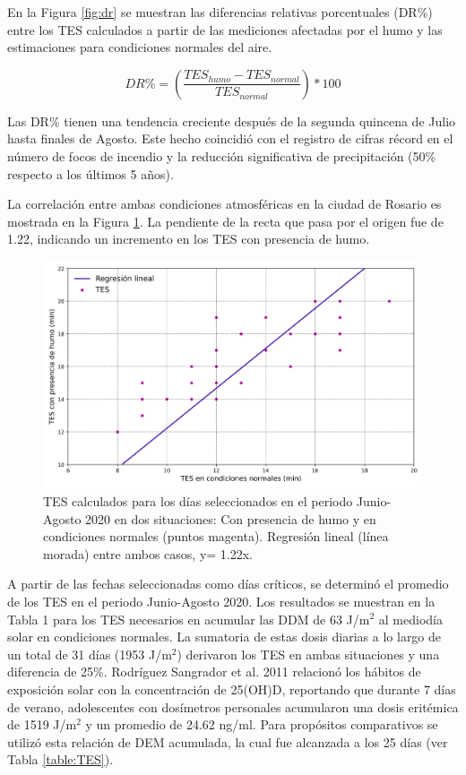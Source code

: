 En la Figura \ref{fig:dr} se muestran las diferencias relativas porcentuales (DR\%) entre los TES calculados a partir de las mediciones afectadas por el humo y las estimaciones para condiciones normales del aire.

\begin{equation*}
    DR\% = \left(\frac{TES_{humo}-TES_{normal}}{TES_{normal}}\right)*100
\end{equation*}

Las DR\% tienen una tendencia creciente después de la segunda quincena de Julio hasta finales de Agosto. Este hecho coincidió con el registro de cifras récord en el número de focos de incendio y la reducción significativa de precipitación (50\% respecto a los últimos 5 años).

La correlación entre ambas condiciones atmosféricas en la ciudad de Rosario es mostrada en la Figura \ref{fig:regresion_lineal}. La pendiente de la recta que pasa por el origen fue de 1.22, indicando un incremento en los TES con presencia de humo.

\begin{figure}[H]
    \centering
    \includegraphics[width=12cm]{Graphics/image9.png}
    \caption{TES calculados  para los días seleccionados en el periodo Junio-Agosto 2020 en dos situaciones: Con presencia de humo y en condiciones normales (puntos magenta). Regresión lineal (línea morada) entre ambos casos, y= 1.22x.}
    \label{fig:regresion_lineal}
\end{figure}

A partir de las fechas seleccionadas como días críticos, se determinó el promedio de los TES en el periodo Junio-Agosto 2020. Los resultados se muestran en la Tabla 1 para los TES necesarios en acumular las DDM de 63 J/m$^2$ al mediodía solar en condiciones normales. La sumatoria de estas dosis diarias a lo largo de un total de 31 días (1953 J/m$^2$) derivaron los TES en ambas situaciones y una diferencia de 25\%. Rodríguez Sangrador et al. 2011 relacionó los hábitos de exposición solar con la concentración de 25(OH)D, reportando que durante 7 días de verano, adolescentes con dosímetros personales acumularon una dosis eritémica de 1519 J/m$^2$ y un promedio de 24.62 ng/ml. Para propósitos comparativos se utilizó esta relación de DEM acumulada, la cual fue alcanzada a los 25 días (ver Tabla \ref{table:TES}).

